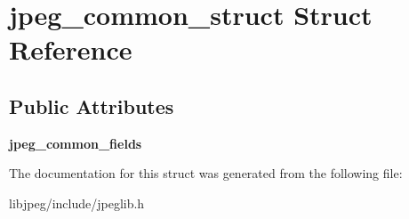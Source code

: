 \hypertarget{structjpeg__common__struct}{\section{jpeg\-\_\-common\-\_\-struct Struct Reference}
\label{structjpeg__common__struct}
}
\subsection*{Public Attributes}
\begin{DoxyCompactItemize}
\item 
\hypertarget{structjpeg__common__struct_af0328603f836658f65d39679f6bbfa7a}{{\bfseries jpeg\-\_\-common\-\_\-fields}}\label{structjpeg__common__struct_af0328603f836658f65d39679f6bbfa7a}

\end{DoxyCompactItemize}


The documentation for this struct was generated from the following file\-:\begin{DoxyCompactItemize}
\item 
libjpeg/include/jpeglib.\-h\end{DoxyCompactItemize}
